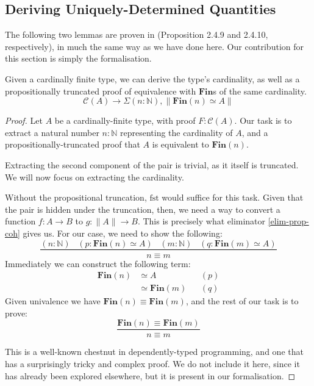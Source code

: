 \subsection{Deriving Uniquely-Determined Quantities}
The following two lemmas are proven in
\cite{yorgeyCombinatorialSpeciesLabelled2014} (Proposition 2.4.9 and 2.4.10,
respectively), in much the same way as we have done here.
Our contribution for this section is simply the formalisation.
\begin{lemma}
  Given a cardinally finite type, we can derive the type's cardinality, as well
  as a propositionally truncated proof of equivalence with \(\textbf{Fin}\)s of
  the same cardinality.
  \begin{equation}
    \mathcal{C}(A) \rightarrow \Sigma {(n : \mathbb{N})} , \lVert \textbf{Fin}(n) \simeq A \rVert
  \end{equation}
\end{lemma}
\begin{proof}
  Let \(A\) be a cardinally-finite type, with proof \(F : \mathcal{C}(A)\).
  Our task is to extract a natural number \(n : \mathbb{N}\) representing the
  cardinality of \(A\), and a propositionally-truncated proof that \(A\) is
  equivalent to \(\mathbf{Fin}(n)\).

  Extracting the second component of the pair is trivial, as it itself is
  truncated.
  We will now focus on extracting the cardinality.

  Without the propositional truncation, \(\text{fst}\) would suffice for this
  task.
  Given that the pair is hidden under the truncation, then, we need a way to
  convert a function \(f : A \rightarrow B\) to \(g : \lVert A \rVert
  \rightarrow B\).
  This is precisely what eliminator \ref{elim-prop-coh} gives us.
  For our case, we need to show the following:
  \begin{equation}
    \frac{(n : \mathbb{N}) \; \; \; (p : \mathbf{Fin}(n) \simeq A) \; \; \;
          (m : \mathbb{N}) \; \; \; (q : \mathbf{Fin}(m) \simeq A)
        }{
          n \equiv m
        }
  \end{equation}
  Immediately we can construct the following term:
  \begin{equation}
    \begin{alignedat}{3}
      \mathbf{Fin}(n) & \simeq A && (p) \\
                      & \simeq \mathbf{Fin}(m) && (q)
    \end{alignedat}
  \end{equation}
  Given univalence we have \(\mathbf{Fin}(n) \equiv \mathbf{Fin}(m)\),
  and the rest of our task is to prove:
  \begin{equation}
    \frac{\mathbf{Fin}(n) \equiv \mathbf{Fin}(m)}{n \equiv m}
  \end{equation}

  This is a well-known chestnut in dependently-typed programming, and one that
  has a surprisingly tricky and complex proof.
  We do not include it here, since it has already been explored elsewhere, but
  it is present in our formalisation.
\end{proof}

